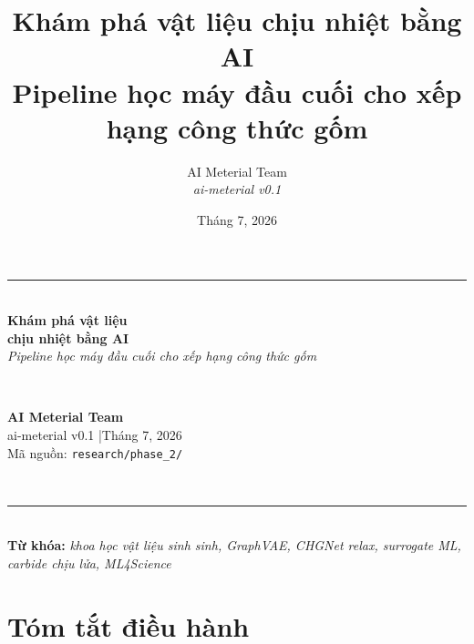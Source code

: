 \documentclass[11pt,a4paper]{report}
\title{\textbf{Khám phá vật liệu chịu nhiệt bằng AI} \\[6pt]
  \large Pipeline học máy đầu cuối cho xếp hạng công thức gốm}
\author{AI Meterial Team \\ \textit{ai-meterial v0.1}}
\date{Tháng 7, 2026}
\begin{document}
\begin{titlepage}
\centering
\vspace*{1.5cm}
{\color{aiBlue}\rule{\linewidth}{1.5pt}}\\[0.5cm]
{\Huge\bfseries\color{aiBlue} Khám phá vật liệu \\[2pt]
  chịu nhiệt bằng AI}\\[0.4cm]
{\large \textit{Pipeline học máy đầu cuối cho xếp hạng công thức gốm}}\\[1.2cm]

\\[1.5cm]

\begin{minipage}{0.75\textwidth}
\centering
\textbf{AI Meterial Team} \\
\small ai-meterial v0.1 \quad|\quad Tháng 7, 2026 \\
\small Mã nguồn: \texttt{research/phase\_2/}
\end{minipage}\\[2cm]

{\color{aiBlue}\rule{\linewidth}{1.5pt}}\\[0.3cm]
\small\textbf{Từ khóa:} \textit{khoa học vật liệu sinh sinh, GraphVAE, CHGNet relax, surrogate ML, carbide chịu lửa, ML4Science}
\vspace{1.5cm}
\end{titlepage}

\tableofcontents
\listoffigures
\listoftables
\newpage

\chapter*{Tóm tắt điều hành}
\end{document}
